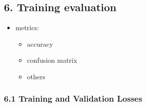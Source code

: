 \documentclass[10pt]{article}
\providecommand{\tightlist}{%
      \setlength{\itemsep}{0pt}\setlength{\parskip}{0pt}}
\begin{document}
    \hypertarget{training-evaluation}{%
\subsection{6. Training evaluation}\label{training-evaluation}}

\begin{itemize}
\tightlist
\item
  metrics:

  \begin{itemize}
  \tightlist
  \item
    accuracy
  \item
    confusion matrix
  \item
    others
  \end{itemize}
\end{itemize}

    \hypertarget{training-and-validation-losses}{%
\subsubsection{6.1 Training and Validation
Losses}\label{training-and-validation-losses}}
\end{document}
